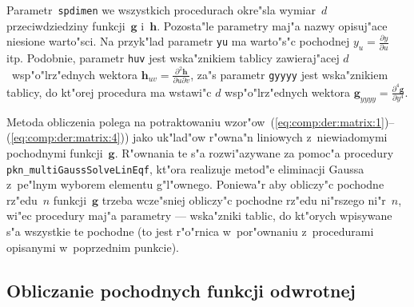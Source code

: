 Parametr~\texttt{spdimen} we wszystkich procedurach okre"sla wymiar~$d$
przeciwdziedziny funkcji~$\bm{g}$ i~$\bm{h}$. Pozosta"le parametry
maj"a nazwy opisuj"ace niesione warto"sci. Na przyk"lad parametr
\texttt{yu} ma warto"s"c pochodnej $y_u=\frac{\partial y}{\partial u}$
itp. Podobnie, parametr \texttt{huv} jest wska"znikiem tablicy
zawieraj"acej $d$~wsp"o"lrz"ednych wektora
$\bm{h}_{uv}=\frac{\partial^2\bm{h}}{\partial u\partial v}$, za"s parametr
\texttt{gyyyy} jest wska"znikiem tablicy, do kt"orej procedura ma wstawi"c
$d$ wsp"o"lrz"ednych wektora
$\bm{g}_{yyyy}=\frac{\partial^4\bm{g}}{\partial y^4}$.

Metoda obliczenia polega na potraktowaniu
wzor"ow~(\ref{eq:comp:der:matrix:1})--(\ref{eq:comp:der:matrix:4})) jako
uk"lad"ow r"owna"n liniowych z~niewiadomymi pochodnymi funkcji~$\bm{g}$.
R"ownania te s"a rozwi"azywane za pomoc"a procedury
\texttt{pkn\_multiGaussSolveLinEqf}, kt"ora realizuje metod"e eliminacji
Gaussa z~pe"lnym wyborem elementu g"l"ownego. Poniewa"r aby obliczy"c
pochodne rz"edu~$n$ funkcji~$\bm{g}$ trzeba wcze"sniej obliczy"c pochodne
rz"edu ni"rszego ni"r~$n$, wi"ec procedury maj"a parametry --- wska"zniki
tablic, do kt"orych wpisywane s"a wszystkie te pochodne
(to jest r"o"rnica w~por"ownaniu z~procedurami opisanymi w~poprzednim
punkcie).


\subsection{Obliczanie pochodnych funkcji odwrotnej}

